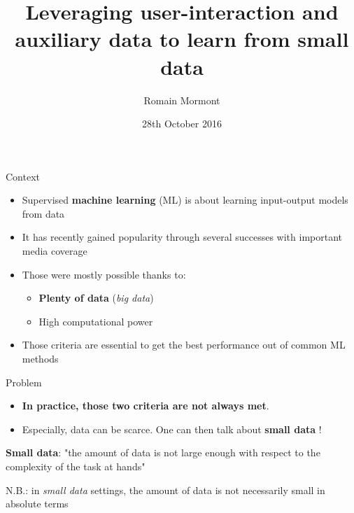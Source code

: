 \documentclass{beamer}
\title{{\bf Leveraging user-interaction and auxiliary data to learn from small data}}
\author{Romain Mormont}
\institute{Systems and modeling unit, \\
Department of EE \& CS, \\ University of Liège, Belgium}
\date{28th October 2016}
\begin{document}
\renewcommand{\inserttotalframenumber}{11}


\begin{frame}
\titlepage
\end{frame}


\begin{frame}{Context}
	\begin{itemize}
		\item Supervised \textbf{machine learning} (ML) is about learning input-output models from data 
		\item It has recently gained popularity through several successes with important media coverage
		\item Those were mostly possible thanks to: 
		\begin{itemize}
			\item \textbf{Plenty of data} (\textit{big data})
			\item High computational power
		\end{itemize}
		\item Those criteria are essential to get the best performance out of common ML methods
	\end{itemize}
\end{frame}

\begin{frame}{Problem}
	\begin{itemize}
		\item \textbf{In practice, those two criteria are not always met}.
		\item Especially, data can be scarce. One can then talk about \textbf{small data} ! 
	\end{itemize}
	\vfill
	\begin{center}
		\large
		\textbf{Small data}: "the amount of data is not large enough with respect to the complexity of the task at hands" 
	\end{center}
	\vfill
	\begin{center}
		\small
		N.B.: in \textit{small data} settings, the amount of data is not necessarily small in absolute terms 
	\end{center}
\end{frame}
\end{document}
